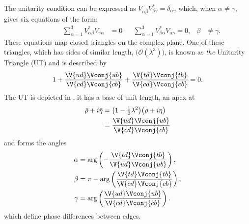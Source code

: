 The unitarity condition can be expressed as
$V_{\alpha\beta}^{\phantom{\dagger}}V_{\beta\gamma}^* = \delta_{\alpha\gamma}$
which, when $\alpha\neq\gamma$, gives six equations of the form:
\begin{align}
  \phantom{\beta\neq\gamma}&&\sum_{\alpha=1}^3V_{\alpha\beta}^*V_{\gamma\alpha}^{\phantom{*}} &= 0
  && \sum_{\alpha=1}^3V_{\beta\alpha}^*V_{\alpha\gamma}^{\phantom{*}}=0, & \beta&\neq\gamma.
  \label{eq:th:offdiag}
\end{align}
These equations map closed triangles on the complex plane.
One of these triangles, which has sides of similar length,
$\big(\mathcal{O}(\lambda^3)\big)$,
is known as \emph{the} Unitarity Triangle (UT) and is described by
\begin{equation}
  1 + \frac{\V{ud}\Vconj{ub}}{\V{cd}\Vconj{cb}} + \frac{\V{td}\Vconj{tb}}{\V{cd}\Vconj{cb}} = 0.
  \label{eq:th:ut}
\end{equation}
The UT is depicted in , it has a base of unit length, an apex at
\begin{align}
  \bar\rho+i\bar\eta &= \big(1-\tfrac12\lambda^2\big)\big(\rho+i\eta\big)
  \nonumber\\
  &=\frac{\V{ud}\Vconj{ub}}{\V{cd}\Vconj{cb}}
\end{align}
and forms the angles
\begin{align}
  \alpha &=    \arg\left(-\frac{\V{td}\Vconj{tb}}{\V{ud}\Vconj{ub}}\right), \nonumber\\
  \beta  &=\pi-\arg\left( \frac{\V{td}\Vconj{tb}}{\V{cd}\Vconj{cb}}\right), \nonumber\\
  \gamma &=    \arg\left( \frac{\V{ud}\Vconj{ub}}{\V{cd}\Vconj{cb}}\right).
\end{align}
which define phase differences between edges.

